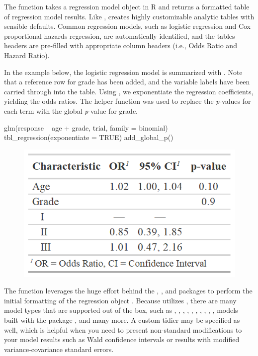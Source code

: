 The  function takes a regression model object in R and returns a formatted table of regression model results.
Like ,  creates highly customizable analytic tables with sensible defaults.
Common regression models, such as logistic regression and Cox proportional hazards regression, are automatically identified, and the tables headers are pre-filled with appropriate column headers (i.e., Odds Ratio and Hazard Ratio).

In the example below, the logistic regression model is summarized with .
Note that a reference row for grade has been added, and the variable labels have been carried through into the table.
Using , we exponentiate the regression coefficients, yielding the odds ratios.
The helper function  was used to replace the \emph{p}-values for each term with the global \emph{p}-value for grade.

\begin{example}
glm(response ~ age + grade, trial, family = binomial) %
  tbl_regression(exponentiate = TRUE) %
  add_global_p()
\end{example}

\begin{figure}[h!]
  \includegraphics[scale=0.73]{regression.png}
  \centering
\end{figure}

The  function leverages the huge effort behind the , , and  packages to perform the initial formatting of the regression object \citep{broom,broom.helpers}.
Because  utilizes , there are many model types that are supported out of the box, such as , , , , , , , , , , models built with the  package \citep{mice}, and many more.
A custom tidier may be specified as well, which is helpful when you need to present non-standard modifications to your model results such as Wald confidence intervals or results with modified variance-covariance standard errors.

